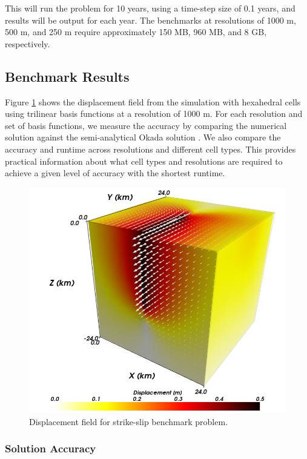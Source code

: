 This will run the problem for 10 years, using a time-step size of 0.1
years, and results will be output for each year. The benchmarks at
resolutions of 1000 m, 500 m, and 250 m require approximately 150 MB,
960 MB, and 8 GB, respectively.


\subsection{Benchmark Results}

Figure \ref{fig:benchmark:strikeslip:solution} shows the displacement
field from the simulation with hexahedral cells using trilinear basis
functions at a resolution of 1000 m. For each resolution and set of
basis functions, we measure the accuracy by comparing the numerical
solution against the semi-analytical Okada solution \cite{Okada:1992}.
We also compare the accuracy and runtime across resolutions and different
cell types. This provides practical information about what cell types
and resolutions are required to achieve a given level of accuracy
with the shortest runtime.

\begin{figure}[htbp]
  \includegraphics[scale=0.33]{benchmarks/figs/strikeslip_soln}
  \caption{Displacement field for strike-slip benchmark problem.}
  \label{fig:benchmark:strikeslip:solution}
\end{figure}

\subsubsection{Solution Accuracy}

